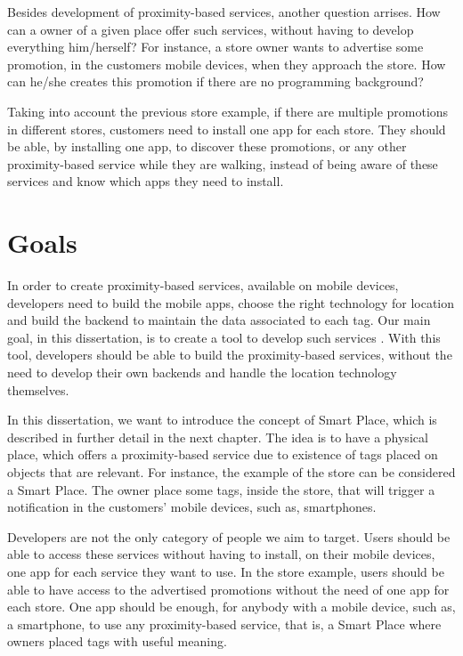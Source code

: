 Besides development of proximity-based services, another question arrises.
How can a owner of a given place offer such services, without having to develop everything him/herself?
For instance, a store owner wants to advertise some promotion, in the customers mobile devices, when they approach the store.
How can he/she creates this promotion if there are no programming background?

Taking into account the previous store example, if there are multiple promotions in different stores, customers need to install one app for each store.
They should be able, by installing one app, to discover these promotions, or any other proximity-based service while they are walking, instead of being aware of these services and know which apps they need to install.

\section{Goals}
\label{sec:introduction_goals}
In order to create proximity-based services, available on mobile devices, developers need to build the mobile apps, choose the right technology for location and build the backend to maintain the data associated to each tag.
Our main goal, in this dissertation, is to create a tool to develop such services%
.
With this tool, developers should be able to build the proximity-based services, without the need to develop their own backends and handle the location technology themselves.

In this dissertation, we want to introduce the concept of Smart Place, which is described in further detail in the next chapter.
The idea is to have a physical place, which offers a proximity-based service due to existence of tags placed on objects that are relevant.
For instance, the example of the store can be considered a Smart Place.
The owner place some tags, inside the store, that will trigger a notification in the customers' mobile devices, such as, smartphones.

Developers are not the only category of people we aim to target.
Users should be able to access these services without having to install, on their mobile devices, one app for each service they want to use.
In the store example, users should be able to have access to the advertised promotions without the need of one app for each store.
One app should be enough, for anybody with a mobile device, such as, a smartphone, to use any proximity-based service, that is, a Smart Place where owners placed tags with useful meaning.

